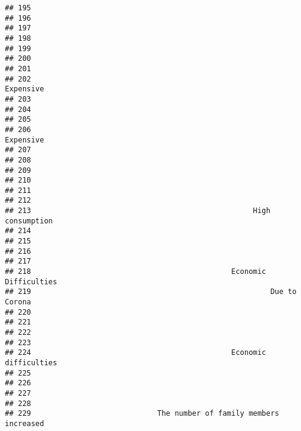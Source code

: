 \documentclass[
]{article}
\begin{document}
\begin{verbatim}
## 195                                                                    
## 196                                                                    
## 197                                                                    
## 198                                                                    
## 199                                                                    
## 200                                                                    
## 201                                                                    
## 202                                                          Expensive 
## 203                                                                    
## 204                                                                    
## 205                                                                    
## 206                                                          Expensive 
## 207                                                                    
## 208                                                                    
## 209                                                                    
## 210                                                                    
## 211                                                                    
## 212                                                                    
## 213                                                   High consumption 
## 214                                                                    
## 215                                                                    
## 216                                                                    
## 217                                                                    
## 218                                              Economic Difficulties 
## 219                                                       Due to Corona
## 220                                                                    
## 221                                                                    
## 222                                                                    
## 223                                                                    
## 224                                              Economic difficulties 
## 225                                                                    
## 226                                                                    
## 227                                                                    
## 228                                                                    
## 229                             The number of family members increased 

\end{verbatim}
\end{document}

